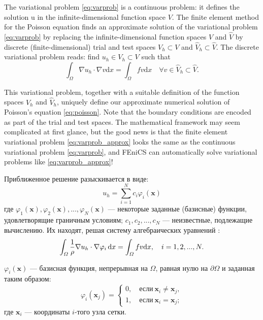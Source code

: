 The variational problem \eqref{eq:varprob} is a continuous problem: it defines the solution u in the infinite-dimensional function space $V$. The finite element method
for the Poisson equation finds an approximate solution of the variational problem \eqref{eq:varprob} by replacing the infinite-dimensional function spaces $V$ and $\hat V$ by
discrete (finite-dimensional) trial and test spaces $V_h \subset V$ and $\hat V_h \subset \hat V$. The discrete variational problem reads: find $u_h \in V_h \subset V$ such that \cite[с. 14]{FEniCS}
\begin{equation} \label{eq:varprob_approx}
\int_{\Omega} \nabla u_{h} \cdot \nabla v \mathrm{d} x=\int_{\Omega} f v \mathrm{d} x \quad \forall v \in \hat{V}_{h} \subset \hat{V}.
\end{equation}

This variational problem, together with a suitable definition of the function spaces $V_h$ and $\hat V_h$, uniquely define our approximate numerical solution
of Poisson’s equation \eqref{eq:poisson}. Note that the boundary conditions are encoded
as part of the trial and test spaces. The mathematical framework may seem
complicated at first glance, but the good news is that the finite element variational problem \eqref{eq:varprob_approx} looks the same as the continuous variational problem
\eqref{eq:varprob}, and FEniCS can automatically solve variational problems like \eqref{eq:varprob_approx}!

Приближенное решение разыскивается в виде:
\begin{equation}
u_h = \sum_{i=1}^N c_i \varphi_i(\bm x)
\end{equation}
где $\varphi_1(\bm x), \varphi_2(\bm x), ..., \varphi_N(\bm x)$
--- некоторые заданные (базисные) функции,
удовлетворящие граничным условиям;
$c_1, c_2, ..., c_N$ --- неизвестные, подлежащие вычислению.
Их находят, решая систему алгебраических уравнений \cite[с. 14]{FEM_intro}:
\begin{equation}
\int_\varOmega \frac 1 \rho \nabla u_h \cdot \nabla \varphi_i \, \mathrm{d}x = \int_{\varOmega} f v \mathrm{d} x, \quad i = 1, 2, ..., N.
\end{equation}

$\varphi_i(\bm x)$ --- базисная функция, непрерывная на $\Omega$,
равная нулю на $\partial \Omega$ и заданная таким образом:
\begin{equation}
\varphi_i(\bm x_j) =
\left\{ \begin{aligned}
    0, \quad \text{если} \ \bm x_i \neq \bm x_j, \\
    1, \quad \text{если} \ \bm x_i = \bm x_j;
\end{aligned} \right.
\end{equation}
где $\bm x_i$ --- координаты $i$-того узла сетки.

\clearpage